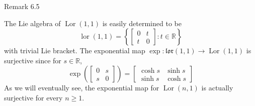 \documentclass[10pt, letterpaper]{article}
\begin{document}
Remark 6.5


The Lie algebra of $\operatorname{Lor}(1,1)$ is easily determined to be
$$
\operatorname{lor}(1,1)=\left\{\left[\begin{array}{ll}
0 & t \\
t & 0
\end{array}\right]: t \in \mathbb{R}\right\}
$$
with trivial Lie bracket. The exponential map $\exp : \mathfrak{l o r}(1,1) \longrightarrow \operatorname{Lor}(1,1)$ is surjective since for $s \in \mathbb{R}$,
$$
\exp \left(\left[\begin{array}{ll}
0 & s \\
s & 0
\end{array}\right]\right)=\left[\begin{array}{ll}
\cosh s & \sinh s \\
\sinh s & \cosh s
\end{array}\right]
$$
As we will eventually see, the exponential map for $\operatorname{Lor}(n, 1)$ is actually surjective for every $n \geqslant 1$.
\end{document}
